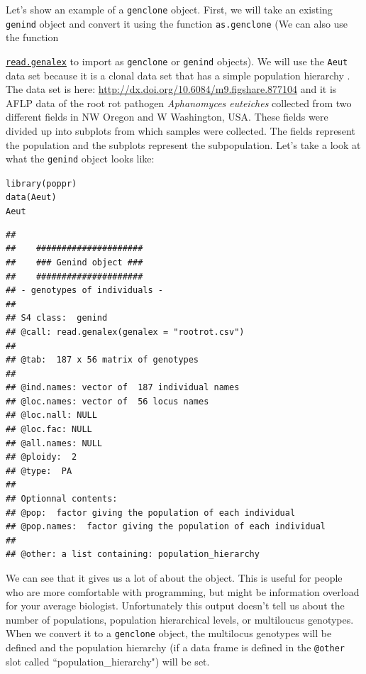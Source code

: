 \documentclass[letterpaper]{article}\usepackage[]{graphicx}\usepackage[]{color}
\makeatletter
\newcommand{\hlstd}[1]{\textcolor[rgb]{0,0,0}{#1}}%
\newcommand{\hlkwd}[1]{\textcolor[rgb]{0,0.267,0.4}{#1}}%
\newenvironment{kframe}{%
 \def\at@end@of@kframe{}%
 \ifinner\ifhmode%
  \def\at@end@of@kframe{\end{minipage}}%
  \begin{minipage}{\columnwidth}%
 \fi\fi%
 \def\FrameCommand##1{\hskip\@totalleftmargin \hskip-\fboxsep
 \colorbox{shadecolor}{##1}\hskip-\fboxsep
     \hskip-\linewidth \hskip-\@totalleftmargin \hskip\columnwidth}%
 \MakeFramed {\advance\hsize-\width
   \@totalleftmargin\z@ \linewidth\hsize
   \@setminipage}}%
 {\par\unskip\endMakeFramed%
 \at@end@of@kframe}
\newenvironment{knitrout}{}{} %
\newcommand{\cmdlink}[2]{
  \texttt{\hyperref[#1]{#2}}
}
\makeatother
\begin{document}
Let's show an example of a \texttt{genclone} object. First, we will take an 
existing \texttt{genind} object and convert it using the function 
\texttt{as.genclone} (We can also use the function 
\cmdlink{intro:import:read.genalex}{read.genalex} to import as
\texttt{genclone} or \texttt{genind} objects). We will use the \texttt{Aeut}
data set because it is a clonal data set that has a simple population hierarchy
\cite{Grunwald:2006}. The data set is here: \url{http://dx.doi.org/10.6084/m9.figshare.877104} and it is AFLP data of the root rot
pathogen \textit{Aphanomyces euteiches} collected from two different fields in
NW Oregon and W Washington, USA. These fields were divided up into subplots from
which samples were collected. The fields represent the population and the
subplots represent the subpopulation. 
Let's take a look at what the \texttt{genind} object looks like:
\begin{knitrout}\footnotesize
{}\color{fgcolor}\begin{kframe}
\begin{alltt}
\hlkwd{library}\hlstd{(poppr)}
\hlkwd{data}\hlstd{(Aeut)}
\hlstd{Aeut}
\end{alltt}
\begin{verbatim}
## 
##    #####################
##    ### Genind object ### 
##    #####################
## - genotypes of individuals - 
## 
## S4 class:  genind
## @call: read.genalex(genalex = "rootrot.csv")
## 
## @tab:  187 x 56 matrix of genotypes
## 
## @ind.names: vector of  187 individual names
## @loc.names: vector of  56 locus names
## @loc.nall: NULL
## @loc.fac: NULL
## @all.names: NULL
## @ploidy:  2
## @type:  PA
## 
## Optionnal contents: 
## @pop:  factor giving the population of each individual
## @pop.names:  factor giving the population of each individual
## 
## @other: a list containing: population_hierarchy
\end{verbatim}
\end{kframe}
\end{knitrout}


We can see that it gives us a lot of about the object. This is useful for people
who are more comfortable with programming, but might be information overload for
your average biologist. Unfortunately this output doesn't tell us about the 
number of populations, population hierarchical levels, or multiloucus genotypes. 
When we convert it to a \texttt{genclone} object, the multilocus genotypes will
be defined and the population hierarchy (if a data frame is defined in the 
\texttt{@other} slot called ``population\_hierarchy") will be set.
\end{document}
